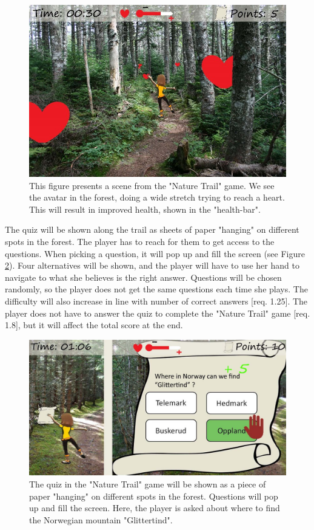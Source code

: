 \begin{figure} [H]
\centering
\includegraphics[scale=0.27]{game1engelsk.jpg}
\caption[Nature trail - stretching]{This figure presents a scene from the "Nature Trail" game. We see the avatar in the forest, doing a wide stretch trying to reach a heart. This will result in improved health, shown in the "health-bar".}
\label{fig:hearts}
\end{figure}

The quiz will be shown along the trail as sheets of paper "hanging" on different spots in the forest. The player has to reach for them to get access to the questions. When picking a question, it will pop up and fill the screen (see Figure \ref{fig:quiz}). Four alternatives will be shown, and the player will have to use her hand to navigate to what she believes is the right answer. Questions will be chosen randomly, so the player does not get the same questions each time she plays. The difficulty will also increase in line with number of correct answers [req. 1.25]. The player does not have to answer the quiz to complete the "Nature Trail" game [req. 1.8], but it will affect the total score at the end. 

\begin{figure} [H]
\centering
\includegraphics[scale=0.25]{quiznyengelsk.jpg}
\caption[Nature trail - quiz]{The quiz in the "Nature Trail" game will be shown as a piece of paper "hanging" on different spots in the forest. Questions will pop up and fill the screen. Here, the player is asked about where to find the Norwegian mountain "Glittertind".}
\label{fig:quiz}
\end{figure} 

